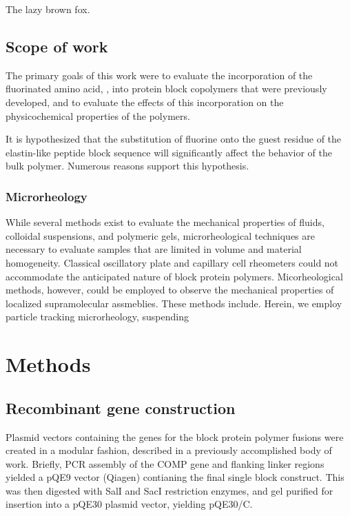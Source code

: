 \begin{refsection}
The lazy brown fox.

\subsection{Scope of work}

The primary goals of this work were to evaluate the incorporation of
the fluorinated amino acid, , into protein block
copolymers that were previously developed, and to evaluate the effects of this
incorporation on the physicochemical properties of the polymers.

It is hypothesized that the substitution of fluorine onto the guest residue of
the elastin-like peptide block sequence will significantly affect the behavior
of the bulk polymer. Numerous reasons support this hypothesis.


\subsubsection{Microrheology}

While several methods exist to evaluate the mechanical properties of fluids,
colloidal suspensions, and polymeric gels, microrheological techniques are
necessary to evaluate samples that are limited in volume and material
homogeneity. Classical oscillatory plate and capillary cell rheometers could not
accommodate the anticipated nature of block protein polymers. Micorheological
methods, however, could be employed to observe the mechanical properties of
localized supramolecular assmeblies. These methods include. Herein, we employ particle tracking microrheology, suspending

\section{Methods}

\subsection{Recombinant gene construction}

Plasmid vectors containing the genes for the block protein polymer fusions were
created in a modular fashion, described in a previously accomplished body of
work.\cite{Haghpanah2009} Briefly, PCR assembly of the COMP gene and
flanking linker regions yielded a pQE9 vector (Qiagen) contianing the final
single block construct. This was then digested with SalI and SacI restriction
enzymes, and gel purified for insertion into a pQE30 plasmid vector, yielding
pQE30/C. 


\end{refsection}
